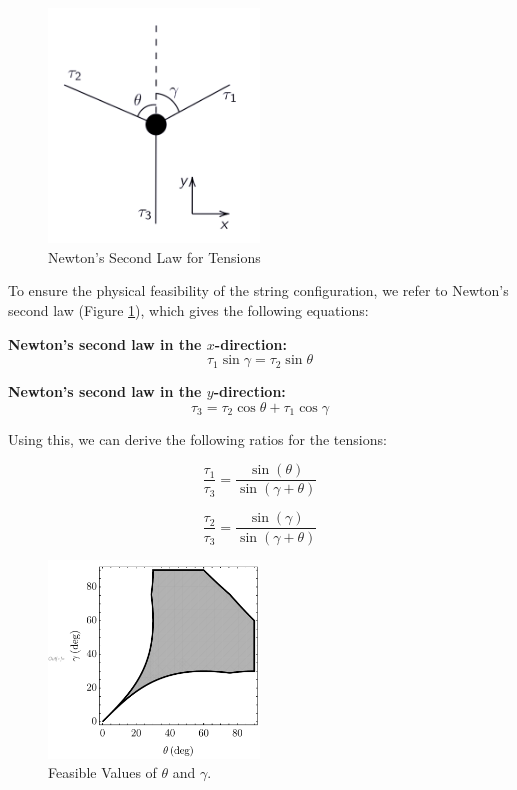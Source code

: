 \documentclass[12pt]{article}
\begin{document}
\begin{figure}[htbp]
    \centering
    \includegraphics[width=0.5\textwidth]{theta_gamma.png}
    \caption{Newton's Second Law for Tensions}
    \label{fig:newtons_second_law}
\end{figure}

To ensure the physical feasibility of the string configuration, we refer to Newton's second law (Figure \ref{fig:newtons_second_law}), which gives the following equations:

\textbf{Newton's second law in the $x$-direction:}
\[\tau_1\sin\gamma = \tau_2\sin\theta\]

\textbf{Newton's second law in the $y$-direction:}
\[\tau_3 = \tau_2\cos \theta + \tau_1\cos\gamma\]

Using this, we can derive the following ratios for the tensions:

\[\frac{\tau_1}{\tau_3} = \frac{\sin(\theta)}{\sin(\gamma+\theta)}\]

\[\frac{\tau_2}{\tau_3} = \frac{\sin(\gamma)}{\sin(\gamma+\theta)}\]

\begin{figure}[H]
\centering
\includegraphics[width=0.5\textwidth]{anglediagram1.pdf}
\caption{Feasible Values of $\theta$ and $\gamma$.}
\label{fig:theta_gamma}
\end{figure}
\end{document}
